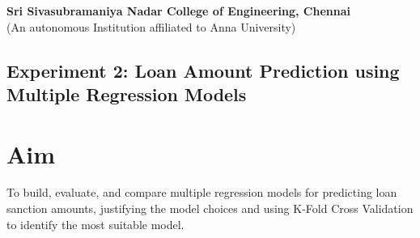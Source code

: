 \documentclass[12pt]{article}
\begin{document}
\begin{center}
    \large \textbf{Sri Sivasubramaniya Nadar College of Engineering, Chennai} \\
    (An autonomous Institution affiliated to Anna University) \\
    \vspace{1cm}
\end{center}

\begin{table}[H]
\renewcommand{\arraystretch}{1.5}
\end{table}

\vspace{1cm}

\begin{center}
 \section*{Experiment 2: Loan Amount Prediction using Multiple Regression Models}
\end{center}

\vspace{1cm}

\section{Aim}
To build, evaluate, and compare multiple regression models for predicting loan sanction amounts, justifying the model choices and using K-Fold Cross Validation to identify the most suitable model.
\end{document}
